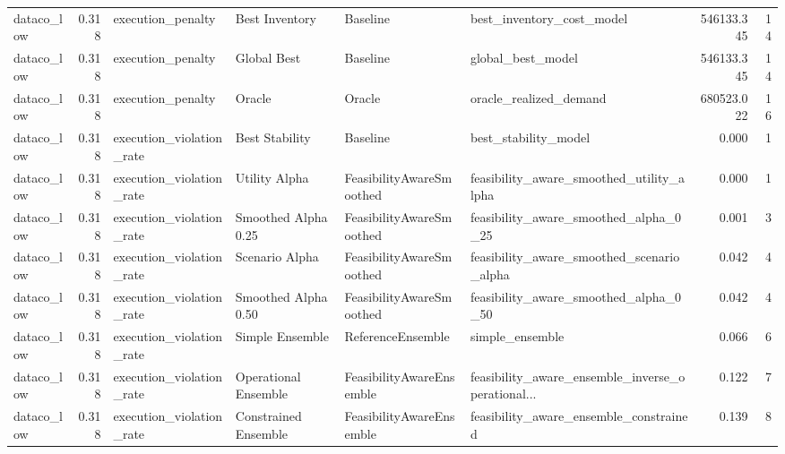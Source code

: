 \begin{table}
{\begin{tabular}{lrllllrr}
    dataco\_low &             0.318 &           execution\_penalty &        Best Inventory &                  Baseline &                          best\_inventory\_cost\_model &    546133.345 &              14 \\
    dataco\_low &             0.318 &           execution\_penalty &           Global Best &                  Baseline &                                  global\_best\_model &    546133.345 &              14 \\
    dataco\_low &             0.318 &           execution\_penalty &                Oracle &                    Oracle &                             oracle\_realized\_demand &    680523.022 &              16 \\
    dataco\_low &             0.318 &    execution\_violation\_rate &        Best Stability &                  Baseline &                               best\_stability\_model &         0.000 &               1 \\
    dataco\_low &             0.318 &    execution\_violation\_rate &         Utility Alpha &  FeasibilityAwareSmoothed &           feasibility\_aware\_smoothed\_utility\_alpha &         0.000 &               1 \\
    dataco\_low &             0.318 &    execution\_violation\_rate &   Smoothed Alpha 0.25 &  FeasibilityAwareSmoothed &              feasibility\_aware\_smoothed\_alpha\_0\_25 &         0.001 &               3 \\
    dataco\_low &             0.318 &    execution\_violation\_rate &        Scenario Alpha &  FeasibilityAwareSmoothed &          feasibility\_aware\_smoothed\_scenario\_alpha &         0.042 &               4 \\
    dataco\_low &             0.318 &    execution\_violation\_rate &   Smoothed Alpha 0.50 &  FeasibilityAwareSmoothed &              feasibility\_aware\_smoothed\_alpha\_0\_50 &         0.042 &               4 \\
    dataco\_low &             0.318 &    execution\_violation\_rate &       Simple Ensemble &         ReferenceEnsemble &                                    simple\_ensemble &         0.066 &               6 \\
    dataco\_low &             0.318 &    execution\_violation\_rate &  Operational Ensemble &  FeasibilityAwareEnsemble &  feasibility\_aware\_ensemble\_inverse\_operational... &         0.122 &               7 \\
    dataco\_low &             0.318 &    execution\_violation\_rate &  Constrained Ensemble &  FeasibilityAwareEnsemble &             feasibility\_aware\_ensemble\_constrained &         0.139 &               8 \\

\end{tabular}}
\end{table}
